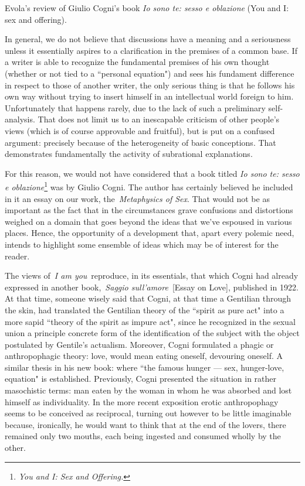 \begin{quotex}
Evola's review of Giulio Cogni's book \emph{Io sono te: sesso e oblazione}
(You and I: sex and offering). 

\end{quotex}
In general, we do not believe that discussions have a meaning and a seriousness unless it essentially aspires to a
clarification in the premises of a common base. If a writer is able to recognize the fundamental premises of his own
thought (whether or not tied to a ``personal equation") and sees his fundament difference in respect to those of another
writer, the only serious thing is that he follows his own way without trying to insert himself in an intellectual world
foreign to him. Unfortunately that happens rarely, due to the lack of such a preliminary self-analysis. That does not
limit us to an inescapable criticism of other people's views (which is of course approvable and
fruitful), but is put on a confused argument: precisely because of the heterogeneity of basic conceptions. That
demonstrates fundamentally the activity of subrational explanations.

For this reason, we would not have considered that a book titled \emph{Io sono te: sesso e oblazione}\footnote{\textit{You and I: Sex and Offering.}} was by Giulio Cogni. The author has certainly believed he included in it an essay on our work,
the \emph{Metaphysics of Sex}. That would not be as important as the fact that in the circumstances grave confusions
and distortions weighed on a domain that goes beyond the ideas that we've espoused in various
places. Hence, the opportunity of a development that, apart every polemic need, intends to highlight some ensemble of
ideas which may be of interest for the reader.

The views of \emph{I am you} reproduce, in its essentials, that which Cogni had already expressed in another
book, \emph{Saggio sull'amore} [Essay on Love], published in 1922. At that time, someone wisely
said that Cogni, at that time a Gentilian through the skin, had translated the Gentilian theory of the ``spirit as pure
act" into a more sapid ``theory of the spirit as impure act", since he recognized in the sexual union a principle
concrete form of the identification of the subject with the object postulated by Gentile's
actualism. Moreover, Cogni formulated a phagic or anthropophagic theory: love, would mean eating oneself, devouring
oneself. A similar thesis in his new book: where ``the famous hunger — sex, hunger-love, equation"
is established. Previously, Cogni presented the situation in rather masochistic terms: man eaten by the woman in whom
he was absorbed and lost himself as individuality. In the more recent exposition erotic anthropophagy seems to be
conceived as reciprocal, turning out however to be little imaginable because, ironically, he would want to think that
at the end of the lovers, there remained only two mouths, each being ingested and consumed wholly by the other.

